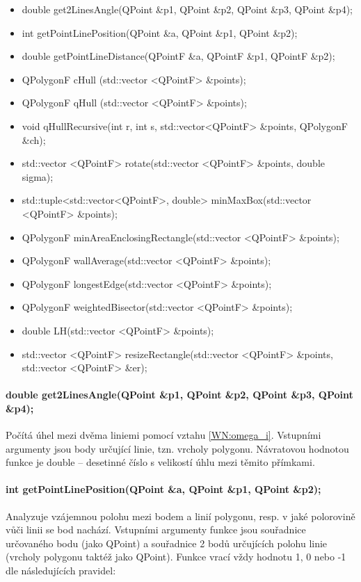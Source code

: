 \documentclass[11pt]{article}
\begin{document}
		\begin{itemize}
			\item double get2LinesAngle(QPoint \&p1, QPoint \&p2, QPoint \&p3, QPoint \&p4);
			\item int getPointLinePosition(QPoint \&a, QPoint \&p1, QPoint \&p2);
			\item double getPointLineDistance(QPointF \&a, QPointF \&p1, QPointF \&p2);
			\item QPolygonF cHull (std::vector <QPointF> \&points);
			\item QPolygonF qHull (std::vector <QPointF> \&points);
			\item void qHullRecursive(int r, int s, std::vector<QPointF> \&points, QPolygonF \&ch);
			\item std::vector <QPointF> rotate(std::vector <QPointF> \&points, double sigma);
			\item std::tuple<std::vector<QPointF>, double> minMaxBox(std::vector <QPointF> \&points);
			\item QPolygonF minAreaEnclosingRectangle(std::vector <QPointF> \&points);
			\item QPolygonF wallAverage(std::vector <QPointF> \&points);
			\item QPolygonF longestEdge(std::vector <QPointF> \&points);
			\item QPolygonF weightedBisector(std::vector <QPointF> \&points);
			\item double LH(std::vector <QPointF> \&points);
			\item std::vector <QPointF> resizeRectangle(std::vector <QPointF> \&points, std::vector <QPointF> \&er);
		\end{itemize}
		
		\paragraph{double get2LinesAngle(QPoint \&p1, QPoint \&p2, QPoint \&p3, QPoint \&p4);}
		Počítá úhel mezi dvěma liniemi pomocí vztahu \ref{WN:omega_i}. Vstupními argumenty jsou body určující linie, tzn. vrcholy polygonu. Návratovou hodnotou funkce je double – desetinné číslo s velikostí úhlu mezi těmito přímkami.  
		
		\paragraph{int getPointLinePosition(QPoint \&a, QPoint \&p1, QPoint \&p2);}
		Analyzuje vzájemnou polohu mezi bodem a linií polygonu, resp. v jaké polorovině vůči linii se bod nachází. Vstupními argumenty funkce jsou souřadnice určovaného bodu (jako QPoint) a souřadnice 2 bodů určujících polohu linie (vrcholy polygonu taktéž jako QPoint). Funkce vrací vždy hodnotu 1, 0 nebo -1 dle následujících pravidel:
		
\end{document}

